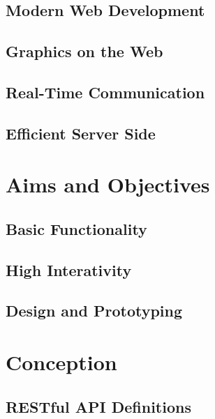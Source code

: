 \documentclass[english, BCOR=6mm, twoside=true, open=right]{tudscrreprt}
\begin{document}
\section{Modern Web Development}

\section{Graphics on the Web}

\section{Real-Time Communication}

\section{Efficient Server Side}



\chapter{Aims and Objectives}
\section{Basic Functionality}
\section{High Interativity}
\section{Design and Prototyping}


\chapter{Conception}
\section{RESTful API Definitions}
\end{document}
